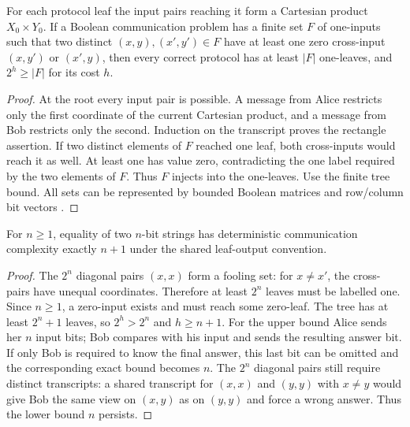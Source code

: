 \begin{lemma}\label{thm:R18}
For each protocol leaf the input pairs reaching it form a Cartesian
product $X_0\times Y_0$. If a Boolean communication problem has a finite
set $F$ of one-inputs such that two distinct $(x,y),(x',y')\in F$ have
at least one zero cross-input $(x,y')$ or $(x',y)$, then every correct
protocol has at least $|F|$ one-leaves, and $2^h\geq|F|$ for its cost $h$.
\end{lemma}
\begin{proof}
At the root every input pair is possible. A message from Alice restricts
only the first coordinate of the current Cartesian product, and a
message from Bob restricts only the second. Induction on the transcript
proves the rectangle assertion. If two distinct elements of $F$ reached
one leaf, both cross-inputs would reach it as well. At least one has
value zero, contradicting the one label required by the two elements of
$F$. Thus $F$ injects into the one-leaves. Use the finite tree bound.
All sets can be represented by bounded Boolean matrices and row/column
bit vectors \cite{blais2025communication}.
\end{proof}

\begin{theorem}
\label{thm:R19}
For $n\geq1$, equality of two $n$-bit strings has deterministic
communication complexity exactly $n+1$ under the shared leaf-output
convention.
\end{theorem}
\begin{proof}
The $2^n$ diagonal pairs $(x,x)$ form a fooling set: for $x\ne x'$, the
cross-pairs have unequal coordinates. Therefore at least $2^n$ leaves
must be labelled one. Since $n\geq1$, a zero-input exists and must reach
some zero-leaf. The tree has at least $2^n+1$ leaves, so $2^h>2^n$ and
$h\geq n+1$. For the upper bound Alice sends her $n$ input bits; Bob
compares with his input and sends the resulting answer bit. If only Bob
is required to know the final answer, this last bit can be omitted and
the corresponding exact bound becomes $n$. The $2^n$ diagonal pairs
still require distinct transcripts: a shared transcript for $(x,x)$ and
$(y,y)$ with $x\ne y$ would give Bob the same view on $(x,y)$ as on
$(y,y)$ and force a wrong answer. Thus the lower bound $n$ persists.
\end{proof}

